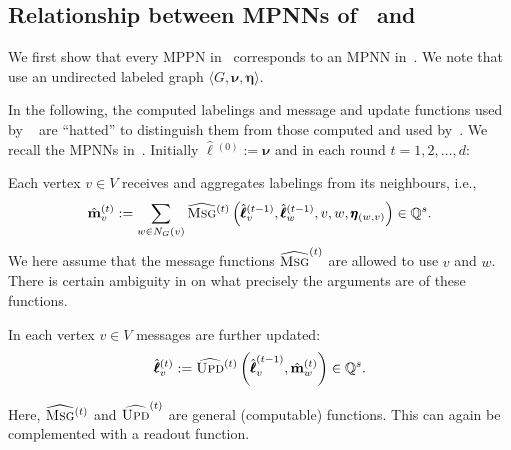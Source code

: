 \documentclass[10pt,a4paper]{article}
\theoremstyle{definition}
\begin{document}
\subsection{Relationship between MPNNs of~\citet{GilmerSRVD17} and~\citet{Loukas2019}}\label{subsec:relationship}
We first show that every MPPN in~\citep{GilmerSRVD17} corresponds to an MPNN in~\citep{Loukas2019}.
We note that~\citet{GilmerSRVD17} use an undirected labeled graph $\langle G,\pmb{\nu},\pmb{\eta}\rangle$. 

In the following, the computed labelings and message and update functions used by ~\citet{GilmerSRVD17} are 
``hatted'' to distinguish them from those computed and used by~\citet{Loukas2019}. We recall the MPNNs in~\citet{GilmerSRVD17}.
Initially $\hat{\pmb{\ell}}{}^{(0)}:=\pmb{\nu}$ and in each round $t=1,2,\ldots,d$:
\noindent
\begin{description}\setlength{\itemsep}{-0.4ex}
\item [Message passing \& aggregation.] Each vertex $v\in V$ receives and aggregates labelings from its neighbours, i.e.,
$$
\hat{\mathbf{m}}^{(t)}_v:=\sum_{w\in N_G(v)}\widehat{\textsc{Msg}}{}^{(t)}\left(\hat{\pmb{\ell}}{}^{(t-1)}_v,\hat{\pmb{\ell}}{}^{(t-1)}_w,v,w,\pmb{\eta}_{(w,v)}\right)\in\mathbb{Q}^{s}.
$$
We here assume that the message functions $\widehat{\textsc{Msg}}^{(t)}$ are allowed to use $v$ and $w$. There is certain ambiguity in \citep{GilmerSRVD17} on what precisely the arguments are of these functions.

\item [Updating.] In each vertex $v\in V$ messages are further updated:
$$
\hat{\pmb{\ell}}{}^{(t)}_v:=\widehat{\textsc{Upd}}{}^{(t)}\left(\hat{\pmb{\ell}}^{(t-1)}_v, \hat{\mathbf{m}}_w^{(t)}\right)\in\mathbb{Q}^{s}.
$$
\end{description}
Here, $\widehat{\textsc{Msg}}{}^{(t)}$ and $\widehat{\textsc{Upd}}^{(t)}$ are general (computable) functions. This can again be complemented with a readout function.
\end{document}
